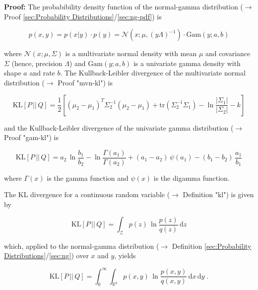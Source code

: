 \documentclass[a4paper,12pt]{book}
\begin{document}
\vspace{1em}
\textbf{Proof:} The probabibility density function of the normal-gamma distribution ($\rightarrow$ Proof \ref{sec:Probability Distributions}/\ref{sec:ng-pdf}) is

\begin{equation} \label{eq:ng-kl-NG-pdf}
p(x,y) = p(x|y) \cdot p(y) = \mathcal{N}(x; \mu, (y \Lambda)^{-1}) \cdot \mathrm{Gam}(y; a, b)
\end{equation}

where $\mathcal{N}(x; \mu, \Sigma)$ is a multivariate normal density with mean $\mu$ and covariance $\Sigma$ (hence, precision $\Lambda$) and $\mathrm{Gam}(y; a, b)$ is a univariate gamma density with shape $a$ and rate $b$. The Kullback-Leibler divergence of the multivariate normal distribution ($\rightarrow$ Proof "mvn-kl") is

\begin{equation} \label{eq:ng-kl-mvn-KL}
\mathrm{KL}[P\,||\,Q] = \frac{1}{2} \left[ (\mu_2 - \mu_1)^T \Sigma_2^{-1} (\mu_2 - \mu_1) + \mathrm{tr}(\Sigma_2^{-1} \Sigma_1) - \ln \frac{|\Sigma_1|}{|\Sigma_2|} - k \right]
\end{equation}

and the Kullback-Leibler divergence of the univariate gamma distribution ($\rightarrow$ Proof "gam-kl") is

\begin{equation} \label{eq:ng-kl-gam-KL}
\mathrm{KL}[P\,||\,Q] = a_2 \, \ln \frac{b_1}{b_2} - \ln \frac{\Gamma(a_1)}{\Gamma(a_2)} + (a_1 - a_2) \, \psi(a_1) - (b_1 - b_2) \, \frac{a_1}{b_1}
\end{equation}

where $\Gamma(x)$ is the gamma function and $\psi(x)$ is the digamma function.

\vspace{1em}
The KL divergence for a continuous random variable ($\rightarrow$ Definition "kl") is given by 

\begin{equation} \label{eq:ng-kl-KL-cont}
\mathrm{KL}[P\,||\,Q] = \int_{\mathcal{Z}} p(z) \, \ln \frac{p(z)}{q(z)} \, \mathrm{d}z
\end{equation}

which, applied to the normal-gamma distribution ($\rightarrow$ Definition \ref{sec:Probability Distributions}/\ref{sec:ng}) over $x$ and $y$, yields

\begin{equation} \label{eq:ng-kl-NG-KL0}
\mathrm{KL}[P\,||\,Q] = \int_{0}^{\infty} \int_{\mathbb{R}^k} p(x,y) \, \ln \frac{p(x,y)}{q(x,y)} \, \mathrm{d}x \, \mathrm{d}y \; .
\end{equation}
\end{document}
